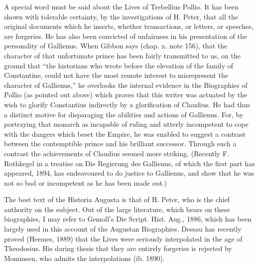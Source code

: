 A special word must be said about the Lives of Trebellius Pollio. It has been shown with tolerable certainty, by the investigations of H. Peter, that all the original documents which he inserts, whether transactions, or letters, or speeches, are forgeries. He has also been convicted of unfairness in his presentation of the personality of Gallienus. When Gibbon says (chap. x. note 156), that the character of that unfortunate prince has been fairly transmitted to us, on the ground that \texthebrew{“}the historians who wrote before the elevation of the family of Constantine, could not have the most remote interest to misrepresent the character of Gallienus,\texthebrew{}” he overlooks the internal evidence in the Biographies of Pollio (as pointed out above) which proves that this writer was actuated by the wish to glorify Constantius indirectly by a glorification of Claudius. He had thus a distinct motive for disparaging the abilities and actions of Gallienus. For, by portraying that monarch as incapable of ruling and utterly incompetent to cope with the dangers which beset the Empire, he was enabled to suggest a contrast between the contemptible prince and his brilliant successor. Through such a contrast the achievements of Claudius seemed more striking. (Recently F. Rothkegel in a treatise on Die Regierung des Gallienus, of which the first part has appeared, 1894, has endeavoured to do justice to Gallienus, and show that he was not so bad or incompetent as he has been made out.)

The best text of the Historia Augusta is that of H. Peter, who is the chief authority on the subject. Out of the large literature, which bears on these biographies, I may refer to Gemoll\texthebrew{}’s Die Script. Hist. Aug., 1886, which has been largely used in this account of the Augustan Biographies. Dessau has recently proved (Hermes, 1889) that the Lives were seriously interpolated in the age of Theodosius. His daring thesis that they are entirely forgeries is rejected by Mommsen, who admits the interpolations (ib. 1890).

